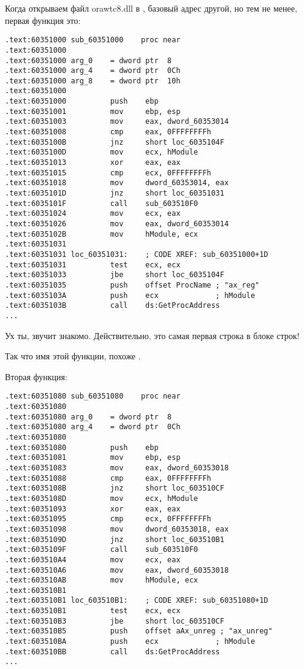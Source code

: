 Когда открываем файл orawtc8.dll в \IDA, базовый адрес другой, но тем не менее, первая функция это:

\begin{lstlisting}[style=customasm]
.text:60351000 sub_60351000    proc near
.text:60351000
.text:60351000 arg_0    = dword ptr  8
.text:60351000 arg_4    = dword ptr  0Ch
.text:60351000 arg_8    = dword ptr  10h
.text:60351000
.text:60351000          push    ebp
.text:60351001          mov     ebp, esp
.text:60351003          mov     eax, dword_60353014
.text:60351008          cmp     eax, 0FFFFFFFFh
.text:6035100B          jnz     short loc_6035104F
.text:6035100D          mov     ecx, hModule
.text:60351013          xor     eax, eax
.text:60351015          cmp     ecx, 0FFFFFFFFh
.text:60351018          mov     dword_60353014, eax
.text:6035101D          jnz     short loc_60351031
.text:6035101F          call    sub_603510F0
.text:60351024          mov     ecx, eax
.text:60351026          mov     eax, dword_60353014
.text:6035102B          mov     hModule, ecx
.text:60351031
.text:60351031 loc_60351031:    ; CODE XREF: sub_60351000+1D
.text:60351031          test    ecx, ecx
.text:60351033          jbe     short loc_6035104F
.text:60351035          push    offset ProcName ; "ax_reg"
.text:6035103A          push    ecx             ; hModule
.text:6035103B          call    ds:GetProcAddress
...
\end{lstlisting}

Ух ты,  звучит знакомо. 
Действительно, это самая первая строка в блоке строк!

Так что имя этой функции, похоже .

Вторая функция:

\begin{lstlisting}[style=customasm]
.text:60351080 sub_60351080    proc near
.text:60351080
.text:60351080 arg_0    = dword ptr  8
.text:60351080 arg_4    = dword ptr  0Ch
.text:60351080
.text:60351080          push    ebp
.text:60351081          mov     ebp, esp
.text:60351083          mov     eax, dword_60353018
.text:60351088          cmp     eax, 0FFFFFFFFh
.text:6035108B          jnz     short loc_603510CF
.text:6035108D          mov     ecx, hModule
.text:60351093          xor     eax, eax
.text:60351095          cmp     ecx, 0FFFFFFFFh
.text:60351098          mov     dword_60353018, eax
.text:6035109D          jnz     short loc_603510B1
.text:6035109F          call    sub_603510F0
.text:603510A4          mov     ecx, eax
.text:603510A6          mov     eax, dword_60353018
.text:603510AB          mov     hModule, ecx
.text:603510B1
.text:603510B1 loc_603510B1:    ; CODE XREF: sub_60351080+1D
.text:603510B1          test    ecx, ecx
.text:603510B3          jbe     short loc_603510CF
.text:603510B5          push    offset aAx_unreg ; "ax_unreg"
.text:603510BA          push    ecx             ; hModule
.text:603510BB          call    ds:GetProcAddress
...
\end{lstlisting}

